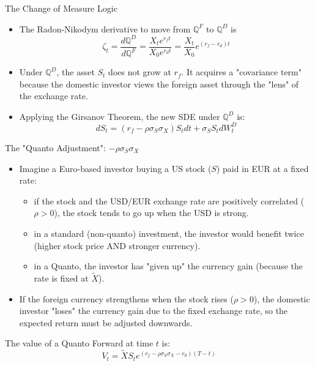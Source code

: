 \documentclass{beamer}
\begin{document}
\begin{frame}{The Change of Measure Logic}
	\begin{itemize}
	\item The Radon-Nikodym derivative to move from $\mathbb{Q}^F$ to $\mathbb{Q}^D$ is %
	\begin{equation}
		\zeta_t = \frac{d\mathbb{Q}^D}{d\mathbb{Q}^F} = \frac{X_t e^{r_f t}}{X_0 e^{r_d t}} = \frac{X_t}{X_0} e^{(r_f - r_d)t}
	\end{equation}
	\item Under $\mathbb{Q}^D$, the asset $S_t$ does not grow at $r_f$. It acquires a "covariance term" because the domestic investor views the foreign asset through the "lens" of the exchange rate.
	\item Applying the Girsanov Theorem, the new SDE under $\mathbb{Q}^D$ is:
	\begin{equation}
		dS_t=(r_f-\rho\sigma_S\sigma_X)S_t dt + \sigma_S S_t dW_t^D
	\end{equation}
	\end{itemize}
\end{frame}

\begin{frame}{The "Quanto Adjustment": $-\rho\sigma_S\sigma_X$}
	\begin{itemize}
		\item Imagine a Euro-based investor buying a US stock ($S$) paid in EUR at a fixed rate:
		\begin{itemize}
			\item if the stock and the USD/EUR exchange rate are positively correlated ($\rho>0$), the stock tends to go up when the USD is strong.
			\item in a standard (non-quanto) investment, the investor would benefit twice (higher stock price AND stronger currency).
			\item in a Quanto, the investor has "given up" the currency gain (because the rate is fixed at $\tilde{X}$).
		\end{itemize}
		\item If the foreign currency strengthens when the stock rises ($\rho > 0$), the domestic investor "loses" the currency gain due to the fixed exchange rate, so the expected return must be adjusted downwards.
	\end{itemize}
	The value of a Quanto Forward at time $t$ is:
	\begin{equation}
		\boxed{V_t=\tilde{X}S_t e^{(r_f-\rho\sigma_S\sigma_X-r_d)(T-t)}}
	\end{equation}
\end{frame}
\end{document}
